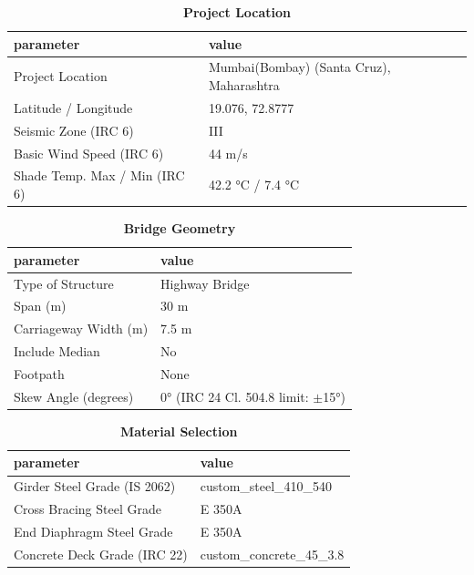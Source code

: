 \documentclass[12pt,a4paper]{report}
\numberwithin{table}{chapter}
\numberwithin{figure}{chapter}
\begin{document}
\begin{table}[H]
\caption{\textbf{Project Location}}
\label{subsec:project-location}
\begin{tabular}{|L{5.5cm}|L{8.5cm}|}
\hline
\textbf{parameter} & \textbf{value} \\
\hline
\textnormal{Project Location} & Mumbai(Bombay) (Santa Cruz), Maharashtra \\
\hline
\textnormal{Latitude / Longitude} & 19.076, 72.8777 \\
\hline
\textnormal{Seismic Zone (IRC 6)} & III \\
\hline
\textnormal{Basic Wind Speed (IRC 6)} & 44 m/s \\
\hline
\textnormal{Shade Temp. Max / Min (IRC 6)} & 42.2 °C / 7.4 °C \\
\hline
\end{tabular}
\vspace{0.4cm}
\end{table}

\begin{table}[H]
\caption{\textbf{Bridge Geometry}}
\label{subsec:bridge-geometry}
\begin{tabular}{|L{5.5cm}|L{8.5cm}|}
\hline
\textbf{parameter} & \textbf{value} \\
\hline
\textnormal{Type of Structure} & Highway Bridge \\
\hline
\textnormal{Span (m)} & 30 m \\
\hline
\textnormal{Carriageway Width (m)} & 7.5 m \\
\hline
\textnormal{Include Median} & No \\
\hline
\textnormal{Footpath} & None \\
\hline
\textnormal{Skew Angle (degrees)} & 0° (IRC 24 Cl. 504.8 limit: $\pm$15°) \\
\hline
\end{tabular}
\end{table}
\vspace{0.4cm}

\begin{table}[H]
\caption{\textbf{Material Selection}}
\label{subsec:material}
\begin{tabular}{|L{5.5cm}|L{8.5cm}|}
\hline
\textbf{parameter} & \textbf{value} \\
\hline
\textnormal{Girder Steel Grade (IS 2062)} & custom\_\allowbreak{}steel\_\allowbreak{}410\_\allowbreak{}540 \\
\hline
\textnormal{Cross Bracing Steel Grade} & E 350A \\
\hline
\textnormal{End Diaphragm Steel Grade} & E 350A \\
\hline
\textnormal{Concrete Deck Grade (IRC 22)} & custom\_\allowbreak{}concrete\_\allowbreak{}45\_\allowbreak{}3.8 \\
\hline
\end{tabular}
\end{table}
\vspace{0.4cm}
\end{document}
